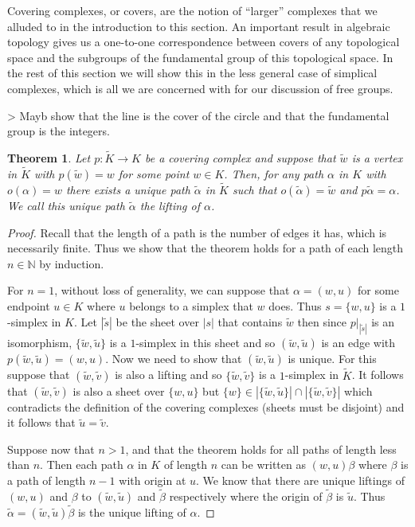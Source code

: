 \documentclass[12pt]{article}
\newtheorem{theorem}{Theorem}
\theoremstyle{definition}
\numberwithin{equation}{theorem}
\begin{document}
Covering complexes, or covers, are the notion of ``larger'' complexes that we alluded to in the introduction to this section. An important result in algebraic topology gives us a one-to-one correspondence between covers of any topological space and the subgroups of the fundamental group of this topological space. In the rest of this section we will show this in the less general case of simplical complexes, which is all we are concerned with for our discussion of free groups.

> Mayb show that the line is the cover of the circle and that the fundamental group is the integers.

\begin{theorem}
  Let $p:\tilde{K} \rightarrow K$ be a covering complex and suppose that $\tilde{w}$ is a vertex in $\tilde{K}$ with $p(\tilde{w}) = w$ for some point $w \in K$. Then, for any path $\alpha$ in $K$ with $o(\alpha) = w$ there exists a \emph{unique} path $\tilde{\alpha}$ in $\tilde{K}$ such that $o(\tilde{\alpha}) = \tilde{w}$ and $p\tilde{\alpha} = \alpha$. We call this unique path $\tilde{\alpha}$ the \emph{lifting} of $\alpha$.
\end{theorem}

\begin{proof}
  Recall that the length of a path is the number of edges it has, which is necessarily finite. Thus we show that the theorem holds for a path of each length $n \in \mathbb{N}$ by induction.

  For $n=1$, without loss of generality, we can suppose that $\alpha = (w,u)$ for some endpoint $u \in K$ where $u$ belongs to a simplex that $w$ does. Thus $s = \{ w,u \}$ is a $1$-simplex in $K$. Let $|\tilde{s}|$ be the sheet over $|s|$ that contains $\tilde{w}$ then since $p \vert_{|\tilde{s}|}$ is an isomorphism, $\{ \tilde{w}, \tilde{u}\}$ is a $1$-simplex in this sheet and so $(\tilde{w},\tilde{u})$ is an edge with $p(\tilde{w},\tilde{u})=(w,u)$. Now we need to show that $(\tilde{w}, \tilde{u})$ is unique. For this suppose that $(\tilde{w}, \tilde{v})$ is also a lifting and so $\{ \tilde{w}, \tilde{v} \}$ is a $1$-simplex in $\tilde{K}$. It follows that $(\tilde{w}, \tilde{v})$ is also a sheet over $\{ w,u \}$ but $\{w\} \in |\{\tilde{w}, \tilde{u}\}| \cap |\{\tilde{w}, \tilde{v}\}|$ which contradicts the definition of the covering complexes (sheets must be disjoint) and it follows that $\tilde{u} = \tilde{v}$.

  Suppose now that $n>1$, and that the theorem holds for all paths of length less than $n$. Then each path $\alpha$ in $K$ of length $n$ can be written as $(w,u)\beta$ where $\beta$ is a path of length $n-1$ with origin at $u$. We know that there are unique liftings of $(w,u)$ and $\beta$ to $(\tilde{w},\tilde{u})$ and $\tilde{\beta}$ respectively where the origin of $\tilde{\beta}$ is $\tilde{u}$. Thus $\tilde{\alpha} = (\tilde{w},\tilde{u})\tilde{\beta}$ is the unique lifting of $\alpha$.
\end{proof}
\end{document}
